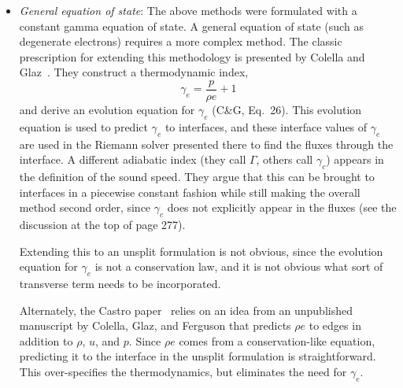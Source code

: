 \documentclass[11pt]{article}
\begin{document}
\begin{itemize}
\item {\em General equation of state}: The above methods were formulated
with a constant gamma equation of state.  A general equation of state
(such as degenerate electrons) requires a more complex method.  The classic
prescription for extending this methodology is presented by Colella and 
Glaz~\cite{colellaglaz:1985}.  They construct a thermodynamic index,
\begin{equation}
\gamma_e = \frac{p}{\rho e} + 1
\end{equation}
and derive an evolution equation for $\gamma_e$ (C\&G, Eq.\ 26).  This
evolution equation is used to predict $\gamma_e$ to interfaces, and
these interface values of $\gamma_e$ are used in the Riemann solver 
presented there to find the fluxes through the interface.  A different
adiabatic index (they call $\Gamma$, others call $\gamma_c$) appears in
the definition of the sound speed.  They argue that this can be brought
to interfaces in a piecewise constant fashion while still making the
overall method second order, since $\gamma_c$ does not explicitly
appear in the fluxes (see the discussion at the top of page 277).

Extending this to an unsplit formulation is not obvious, since the
evolution equation for $\gamma_e$ is not a conservation law, and it
is not obvious what sort of transverse term needs to be incorporated.

Alternately, the Castro paper~\cite{almgren:2010} relies on an idea
from an unpublished manuscript by Colella, Glaz, and Ferguson that
predicts $\rho e$ to edges in addition to $\rho$, $u$, and $p$.  Since
$\rho e$ comes from a conservation-like equation, predicting it to the
interface in the unsplit formulation is straightforward.  This
over-specifies the thermodynamics, but eliminates the need for
$\gamma_e$.


\end{itemize}
\end{document}
